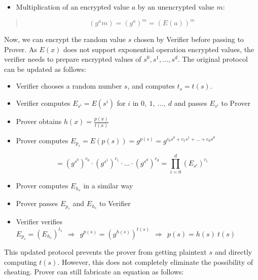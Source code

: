 \documentclass[
]{report}
\providecommand{\tightlist}{%
  \setlength{\itemsep}{0pt}\setlength{\parskip}{0pt}}
\begin{document}
\begin{itemize}
\tightlist
\item
  Multiplication of an encrypted value \(a\) by an unencrypted value
  \(m\):
\end{itemize}

\begin{quote}
\[\left( g^{a}m \right) = \left( g^{a} \right)^{m} = \left( E(a) \right)^{m}\]
\end{quote}

Now, we can encrypt the random value \(s\) chosen by Verifier before
passing to Prover. As \(E(x)\) does not support exponential operation
encrypted values, the verifier needs to prepare encrypted values of
\(s^{0},s^{1},\ldots,s^{d}\). The original protocol can be updated as
follows:

\begin{itemize}
\item
  Verifier chooses a random number \(s\), and computes \(t_{s} = t(s)\).
\item
  Verifier computes \(E_{s^{i}} = E\left( s^{i} \right)\) for \(i\) in
  \(0,\ 1,\ \ldots,\ d\) and passes \(E_{s^{i}}\) to Prover
\item
  Prover obtains \(h(x) = \frac{p(x)}{t(x)}\)
\item
  Prover computes
  \(E_{p_{s}} = E\left( p(s) \right) = g^{p(s)} = g^{c_{0}s^{0} + c_{1}s^{1} + \ldots + c_{d}s^{d}}\)
\end{itemize}

\[= \left( g^{s^{0}} \right)^{c_{0}} \cdot \left( g^{s^{1}} \right)^{c_{1}} \cdot \ldots \cdot \left( g^{s^{d}} \right)^{c_{d}} = \prod_{i = 0}^{d}\left( E_{s^{i}} \right)^{c_{i}}\]

\begin{itemize}
\item
  Prover computes \(E_{h_{s}}\) in a similar way
\item
  Prover passes \(E_{p_{s}}\) and \(E_{h_{s}}\) to Verifier
\item
  Verifier verifies
  \(E_{p_{s}} = \left( E_{h_{s}} \right)^{t_{s}}\mathbf{\ \  \Rightarrow \ \ }g^{p(s)} = \left( g^{h(s)} \right)^{t(s)}\mathbf{\ \  \Rightarrow \ \ }p(s) = h(s)\ t(s)\)
\end{itemize}

This updated protocol prevents the prover from getting plaintext \(s\)
and directly computing \(t(s)\). However, this does not completely
eliminate the possibility of cheating. Prover can still fabricate an
equation as follows:
\end{document}
